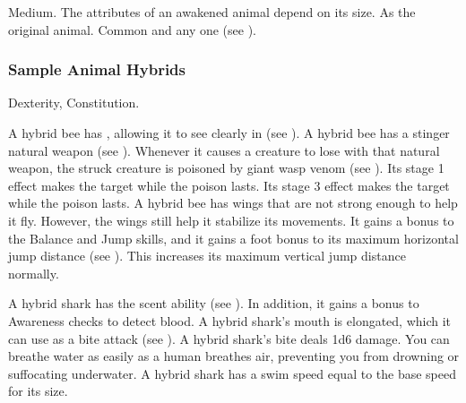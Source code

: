          Medium.
         The attributes of an awakened animal depend on its size.
         As the original animal.
         Common and any one  (see ).

        \subsubsection{Sample Animal Hybrids}


              Dexterity,  Constitution.
            \begin{itemize}
                 A hybrid bee has , allowing it to see clearly in  (see ).
                 A hybrid bee has a stinger natural weapon (see ).
                    Whenever it causes a creature to lose  with that natural weapon, the struck creature is poisoned by giant wasp venom (see ).
                    Its stage 1 effect makes the target \slowed while the poison lasts.
                    Its stage 3 effect makes the target \immobilized while the poison lasts.
                 A hybrid bee has wings that are not strong enough to help it fly.
                    However, the wings still help it stabilize its movements.
                    It gains a  bonus to the Balance and Jump skills, and it gains a  foot bonus to its maximum horizontal jump distance (see ).
                    This increases its maximum vertical jump distance normally.
            \end{itemize}


            \begin{itemize}
                 A hybrid shark has the scent ability (see ).
                    In addition, it gains a  bonus to Awareness checks to detect blood.
                 A hybrid shark's mouth is elongated, which it can use as a bite attack (see ).
                    A hybrid shark's bite deals 1d6 damage.
                 You can breathe water as easily as a human breathes air, preventing you from drowning or suffocating underwater.
                 A hybrid shark has a swim speed equal to the base speed for its size.
            \end{itemize}

